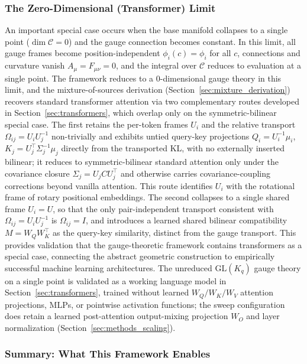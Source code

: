 \documentclass[11pt]{article}
\begin{document}
\subsubsection{The Zero-Dimensional (Transformer) Limit}

An important special case occurs when the base manifold collapses to a single point ($\dim\mathcal{C} = 0$) and the gauge connection becomes constant. In this limit, all gauge frames become position-independent $\phi_i(c) = \phi_i$ for all $c$, connections and curvature vanish $A_\mu = F_{\mu\nu} = 0$, and the integral over $\mathcal{C}$ reduces to evaluation at a single point. The framework reduces to a 0-dimensional gauge theory in this limit, and the mixture-of-sources derivation (Section~\ref{sec:mixture_derivation}) recovers standard transformer attention via two complementary routes developed in Section~\ref{sec:transformers}, which overlap only on the symmetric-bilinear special case. The first retains the per-token frames $U_i$ and the relative transport $\Omega_{ij} = U_iU_j^{-1}$ non-trivially and exhibits untied query-key projections $Q_i = U_i^{-1}\mu_i$, $K_j = U_j^\top\Sigma_j^{-1}\mu_j$ directly from the transported KL, with no externally inserted bilinear; it reduces to symmetric-bilinear standard attention only under the covariance closure $\Sigma_j = U_jCU_j^\top$ and otherwise carries covariance-coupling corrections beyond vanilla attention. This route identifies $U_i$ with the rotational frame of rotary positional embeddings. The second collapses to a single shared frame $U_i = U$, so that the only pair-independent transport consistent with $\Omega_{ij} = U_iU_j^{-1}$ is $\Omega_{ij} = I$, and introduces a learned shared bilinear compatibility $M = W_QW_K^\top$ as the query-key similarity, distinct from the gauge transport. This provides validation that the gauge-theoretic framework contains transformers as a special case, connecting the abstract geometric construction to empirically successful machine learning architectures. The unreduced $\mathrm{GL}(K_q)$ gauge theory on a single point is validated as a working language model in Section~\ref{sec:transformers}, trained without learned $W_Q/W_K/W_V$ attention projections, MLPs, or pointwise activation functions; the sweep configuration does retain a learned post-attention output-mixing projection $W_O$ and layer normalization (Section~\ref{sec:methods_scaling}).

\subsubsection{Summary: What This Framework Enables}
\end{document}
